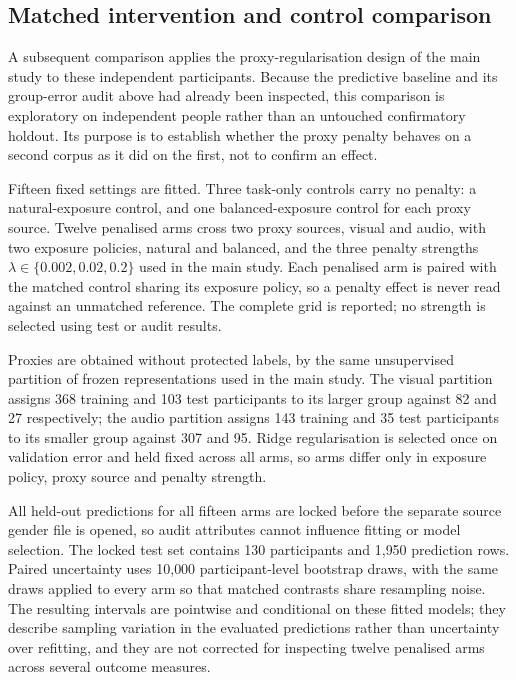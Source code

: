 \subsection{Matched intervention and control comparison}
\label{sec:avi-compact-method}

A subsequent comparison applies the proxy-regularisation design of the main study to these
independent participants. Because the predictive baseline and its group-error audit above
had already been inspected, this comparison is exploratory on independent people rather
than an untouched confirmatory holdout. Its purpose is to establish whether the proxy
penalty behaves on a second corpus as it did on the first, not to confirm an effect.

Fifteen fixed settings are fitted. Three task-only controls carry no penalty: a
natural-exposure control, and one balanced-exposure control for each proxy source. Twelve
penalised arms cross two proxy sources, visual and audio, with two exposure policies,
natural and balanced, and the three penalty strengths $\lambda\in\{0.002,0.02,0.2\}$ used
in the main study. Each penalised arm is paired with the matched control sharing its
exposure policy, so a penalty effect is never read against an unmatched reference. The
complete grid is reported; no strength is selected using test or audit results.

Proxies are obtained without protected labels, by the same unsupervised partition of
frozen representations used in the main study. The visual partition assigns 368 training
and 103 test participants to its larger group against 82 and 27 respectively; the audio
partition assigns 143 training and 35 test participants to its smaller group against 307
and 95. Ridge regularisation is selected once on validation error and held fixed across
all arms, so arms differ only in exposure policy, proxy source and penalty strength.

All held-out predictions for all fifteen arms are locked before the separate source gender
file is opened, so audit attributes cannot influence fitting or model selection. The locked
test set contains 130 participants and 1{,}950 prediction rows. Paired uncertainty uses
10{,}000 participant-level bootstrap draws, with the same draws applied to every arm so
that matched contrasts share resampling noise. The resulting intervals are pointwise and
conditional on these fitted models; they describe sampling variation in the evaluated
predictions rather than uncertainty over refitting, and they are not corrected for
inspecting twelve penalised arms across several outcome measures.

